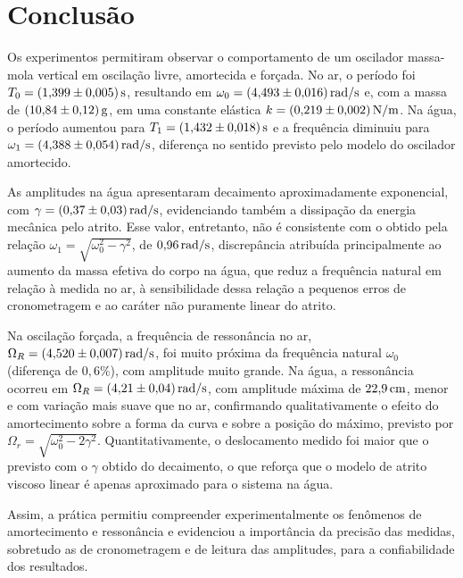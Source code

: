 \section{Conclusão}

Os experimentos permitiram observar o comportamento de um oscilador massa-mola vertical em oscilação livre, amortecida e forçada. No ar, o período foi $T_0=(1{,}399\pm0{,}005)\,\mathrm{s}$, resultando em $\omega_0=(4{,}493\pm0{,}016)\,\mathrm{rad/s}$ e, com a massa de $(10{,}84\pm0{,}12)\,\mathrm{g}$, em uma constante elástica $k=(0{,}219\pm0{,}002)\,\mathrm{N/m}$. Na água, o período aumentou para $T_1=(1{,}432\pm0{,}018)\,\mathrm{s}$ e a frequência diminuiu para $\omega_1=(4{,}388\pm0{,}054)\,\mathrm{rad/s}$, diferença no sentido previsto pelo modelo do oscilador amortecido.

As amplitudes na água apresentaram decaimento aproximadamente exponencial, com $\gamma=(0{,}37\pm0{,}03)\,\mathrm{rad/s}$, evidenciando também a dissipação da energia mecânica pelo atrito. Esse valor, entretanto, não é consistente com o obtido pela relação $\omega_1=\sqrt{\omega_0^2-\gamma^2}$, de $0{,}96\,\mathrm{rad/s}$, discrepância atribuída principalmente ao aumento da massa efetiva do corpo na água, que reduz a frequência natural em relação à medida no ar, à sensibilidade dessa relação a pequenos erros de cronometragem e ao caráter não puramente linear do atrito.

Na oscilação forçada, a frequência de ressonância no ar, $\Omega_R=(4{,}520\pm0{,}007)\,\mathrm{rad/s}$, foi muito próxima da frequência natural $\omega_0$ (diferença de $0{,}6\%$), com amplitude muito grande. Na água, a ressonância ocorreu em $\Omega_R=(4{,}21\pm0{,}04)\,\mathrm{rad/s}$, com amplitude máxima de $22{,}9\,\mathrm{cm}$, menor e com variação mais suave que no ar, confirmando qualitativamente o efeito do amortecimento sobre a forma da curva e sobre a posição do máximo, previsto por $\Omega_r=\sqrt{\omega_0^2-2\gamma^2}$. Quantitativamente, o deslocamento medido foi maior que o previsto com o $\gamma$ obtido do decaimento, o que reforça que o modelo de atrito viscoso linear é apenas aproximado para o sistema na água.

Assim, a prática permitiu compreender experimentalmente os fenômenos de amortecimento e ressonância e evidenciou a importância da precisão das medidas, sobretudo as de cronometragem e de leitura das amplitudes, para a confiabilidade dos resultados.
